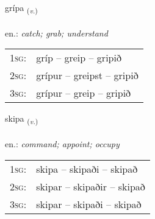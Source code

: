 \documentclass[frontgrid, backgrid]{flacards}\usepackage[]{graphicx}\usepackage[]{xcolor}
\begin{document}
\renewcommand{\flhead}{\vskip5pt \fboxsep=0pt {\small\bfseries\footnotesize Sagnorð | Verb}}
\renewcommand{\fcfoot}{\vskip5pt \fboxsep=0pt \hspace{2pt}{\small\bfseries\footnotesize 1K}}

\renewcommand{\blhead}{\vskip5pt {\small\bfseries\footnotesize Sagnorð | Verb }}
\renewcommand{\bcfoot}{\vskip5pt \hspace{2pt}{\small\bfseries\footnotesize 1K}}


{grípa \small{\textsubscript{(\textit{v.})}} \\[1ex] %
\textphonetic{[kriːpa]} \\
en.: \emph{catch; grab; understand} \\  [2ex]
\renewcommand*{\arraystretch}{0.8}
\begin{tabular}{p{1cm}l}
\textsc{1sg}: & gríp -- greip -- gripið \\ 
\textsc{2sg}: & grípur -- greipst -- gripið \\ 
\textsc{3sg}: & grípur -- greip -- gripið \\ 
\end{tabular}
}

\renewcommand{\flhead}{\vskip5pt \fboxsep=0pt {\small\bfseries\footnotesize Sagnorð | Verb}}
\renewcommand{\fcfoot}{\vskip5pt \fboxsep=0pt \hspace{2pt}{\small\bfseries\footnotesize 1K}}

\renewcommand{\blhead}{\vskip5pt {\small\bfseries\footnotesize Sagnorð | Verb }}
\renewcommand{\bcfoot}{\vskip5pt \hspace{2pt}{\small\bfseries\footnotesize 1K}}


{skipa \small{\textsubscript{(\textit{v.})}} \\[1ex] %
\textphonetic{[scɪːpa]} \\
en.: \emph{command; appoint; occupy} \\  [2ex]
\renewcommand*{\arraystretch}{0.8}
\begin{tabular}{p{1cm}l}
\textsc{1sg}: & skipa -- skipaði -- skipað \\ 
\textsc{2sg}: & skipar -- skipaðir -- skipað \\ 
\textsc{3sg}: & skipar -- skipaði -- skipað \\ 
\end{tabular}
}
\end{document}
